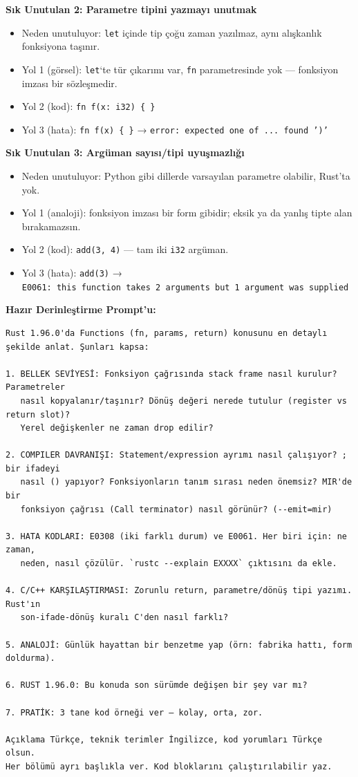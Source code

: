 \documentclass[12pt,a4paper]{article}
\begin{document}
\textbf{Sık Unutulan 2: Parametre tipini yazmayı unutmak}

\begin{itemize}
\tightlist
\item
  Neden unutuluyor: \texttt{let} içinde tip çoğu zaman yazılmaz, aynı alışkanlık fonksiyona taşınır.
\item
  Yol 1 (görsel): \texttt{let}`te tür çıkarımı var, \texttt{fn} parametresinde yok --- fonksiyon imzası bir sözleşmedir.
\item
  Yol 2 (kod): \texttt{fn\ f(x:\ i32)\ \{\ \}}
\item
  Yol 3 (hata): \texttt{fn\ f(x)\ \{\ \}} → \texttt{error:\ expected\ one\ of\ ...\ found\ ')'}
\end{itemize}

\textbf{Sık Unutulan 3: Argüman sayısı/tipi uyuşmazlığı}

\begin{itemize}
\tightlist
\item
  Neden unutuluyor: Python gibi dillerde varsayılan parametre olabilir, Rust'ta yok.
\item
  Yol 1 (analoji): fonksiyon imzası bir form gibidir; eksik ya da yanlış tipte alan bırakamazsın.
\item
  Yol 2 (kod): \texttt{add(3,\ 4)} --- tam iki \texttt{i32} argüman.
\item
  Yol 3 (hata): \texttt{add(3)} → \texttt{E0061:\ this\ function\ takes\ 2\ arguments\ but\ 1\ argument\ was\ supplied}
\end{itemize}

\textbf{Hazır Derinleştirme Prompt'u:}

\begin{verbatim}
Rust 1.96.0'da Functions (fn, params, return) konusunu en detaylı şekilde anlat. Şunları kapsa:

1. BELLEK SEVİYESİ: Fonksiyon çağrısında stack frame nasıl kurulur? Parametreler
   nasıl kopyalanır/taşınır? Dönüş değeri nerede tutulur (register vs return slot)?
   Yerel değişkenler ne zaman drop edilir?

2. COMPILER DAVRANIŞI: Statement/expression ayrımı nasıl çalışıyor? ; bir ifadeyi
   nasıl () yapıyor? Fonksiyonların tanım sırası neden önemsiz? MIR'de bir
   fonksiyon çağrısı (Call terminator) nasıl görünür? (--emit=mir)

3. HATA KODLARI: E0308 (iki farklı durum) ve E0061. Her biri için: ne zaman,
   neden, nasıl çözülür. `rustc --explain EXXXX` çıktısını da ekle.

4. C/C++ KARŞILAŞTIRMASI: Zorunlu return, parametre/dönüş tipi yazımı. Rust'ın
   son-ifade-dönüş kuralı C'den nasıl farklı?

5. ANALOJİ: Günlük hayattan bir benzetme yap (örn: fabrika hattı, form doldurma).

6. RUST 1.96.0: Bu konuda son sürümde değişen bir şey var mı?

7. PRATİK: 3 tane kod örneği ver — kolay, orta, zor.

Açıklama Türkçe, teknik terimler İngilizce, kod yorumları Türkçe olsun.
Her bölümü ayrı başlıkla ver. Kod bloklarını çalıştırılabilir yaz.
\end{verbatim}
\end{document}

